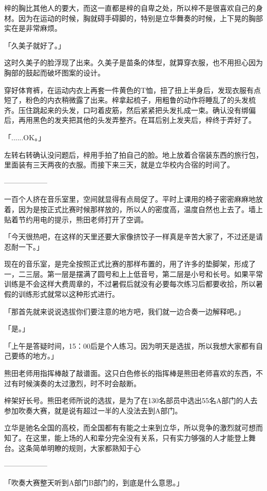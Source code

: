 \documentclass[UTF8]{ctexart}
\begin{document}
    梓的胸比其他人的要大，而这一直都是梓的自卑之处，所以梓不是很喜欢自己的身材。因为在运动的时候，胸就碍手碍脚的，特别是立华舞奏的时候，上下晃的胸部实在是非常麻烦。

    「久美子就好了。」

    这时久美子的脸浮现了出来。久美子是苗条的体型，就算穿衣服，也不用担心因为胸部的鼓起而破坏图案的设计。

    穿好体育裤，在运动内衣上再套一件黄色的T恤，扭了扭上半身后，发现衣服有点短了，粉色的内衣稍微露了出来。梓拿起梳子，用粗鲁的动作将睡乱了的头发梳齐。压住跳起来的头发，口叼着皮筋，然后紧紧把头发扎成一束。确认没有绑偏后，再用黑色的发夹把其他的头发弄整齐。在耳后别上发夹后，梓终于弄好了。

    「......OK。」

    左转右转确认没问题后，梓用手拍了拍自己的脸。地上放着合宿装东西的旅行包，里面装有三天两夜的衣服。而接下来三天，就是立华校内合宿的时间了。

    ——————

    一百个人挤在音乐室里，空间就显得有点局促了。平时上课用的椅子密密麻麻地放着，因为是按正式比赛时候那样放的，所以人的密度高，温度自然也上去了。墙上贴着节约用电的提示，熊田老师打开了空调。

    「今天很热吧，在这样的天里还要大家像挤饺子一样真是辛苦大家了，不过还是请忍耐一下。」

    现在的音乐室，是完全按照正式比赛的那样布置的，用了许多的垫脚架，形成了一，二三层。第一层是摆满了圆号和上上低音号，第二层是小号和长号。如果平常训练是不会这样大费周章的，不过暑假后就没有必要每次练习后都要收拾，所以暑假的训练形式就常以这种形式进行。

    「那首先就来说说选拔你们要注意的地方吧，我们就一边合奏一边解释吧。」

    「是。」

    「上午是答疑时间，15：00后是个人练习。因为明天是选拔，所以我想大家都有自己要练的地方。」

    熊田老师用指挥棒敲了敲谱面。这只白色修长的指挥棒是熊田老师喜欢的东西，不过有时候演奏的太过激烈，时不时会敲断。

    梓架好长号。熊田老师所说的选拔，是为了在130名部员中选出55名A部门的人去参加吹奏大赛，就是说有超过一半的人没法去到A部门。

    立华是驰名全国的高校，而全国都有有能之士来到立华，所以竞争的激烈就可想而知了。在这里，能上场的人和辈分完全没有关系，只有实力够强的人才能登上舞台。这条简单明瞭的规则，大家都熟知于心

    ——————

    「吹奏大赛整天听到A部门B部门的，到底是什么意思。」
\end{document}

